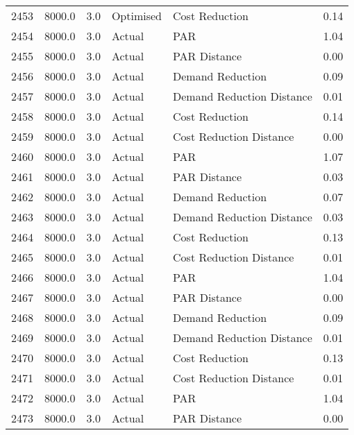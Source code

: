 \begin{longtable}{lrrllr}
2453 &       8000.0 &     3.0 &      Optimised &             Cost Reduction &   0.14 \\
2454 &       8000.0 &     3.0 &         Actual &                        PAR &   1.04 \\
2455 &       8000.0 &     3.0 &         Actual &               PAR Distance &   0.00 \\
2456 &       8000.0 &     3.0 &         Actual &           Demand Reduction &   0.09 \\
2457 &       8000.0 &     3.0 &         Actual &  Demand Reduction Distance &   0.01 \\
2458 &       8000.0 &     3.0 &         Actual &             Cost Reduction &   0.14 \\
2459 &       8000.0 &     3.0 &         Actual &    Cost Reduction Distance &   0.00 \\
2460 &       8000.0 &     3.0 &         Actual &                        PAR &   1.07 \\
2461 &       8000.0 &     3.0 &         Actual &               PAR Distance &   0.03 \\
2462 &       8000.0 &     3.0 &         Actual &           Demand Reduction &   0.07 \\
2463 &       8000.0 &     3.0 &         Actual &  Demand Reduction Distance &   0.03 \\
2464 &       8000.0 &     3.0 &         Actual &             Cost Reduction &   0.13 \\
2465 &       8000.0 &     3.0 &         Actual &    Cost Reduction Distance &   0.01 \\
2466 &       8000.0 &     3.0 &         Actual &                        PAR &   1.04 \\
2467 &       8000.0 &     3.0 &         Actual &               PAR Distance &   0.00 \\
2468 &       8000.0 &     3.0 &         Actual &           Demand Reduction &   0.09 \\
2469 &       8000.0 &     3.0 &         Actual &  Demand Reduction Distance &   0.01 \\
2470 &       8000.0 &     3.0 &         Actual &             Cost Reduction &   0.13 \\
2471 &       8000.0 &     3.0 &         Actual &    Cost Reduction Distance &   0.01 \\
2472 &       8000.0 &     3.0 &         Actual &                        PAR &   1.04 \\
2473 &       8000.0 &     3.0 &         Actual &               PAR Distance &   0.00 \\

\end{longtable}
